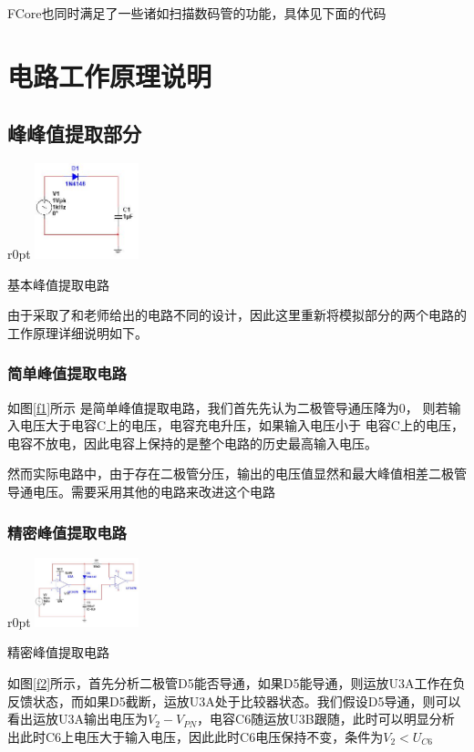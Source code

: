 \documentclass[UTF8,a4paper,landscape,16pt]{paper}
\begin{document}
\begin{multicols}{4}
\noindent FCore也同时满足了一些诸如扫描数码管的功能，具体见下面的代码

\noindent 
\section{电路工作原理说明}\small
\subsection{峰峰值提取部分}
\begin {wrapfigure}{r}{0pt}
\includegraphics [width=30mm]{f1.jpg}
\caption{基本峰值提取电路}
\label{f1}
\end {wrapfigure}
 由于采取了和老师给出的电路不同的设计，因此这里重新将模拟部分的两个电路的工作原理详细说明如下。

\subsubsection{简单峰值提取电路}

\noindent 如图\ref{f1}所示
是简单峰值提取电路，我们首先先认为二极管导通压降为0，
则若输入电压大于电容C上的电压，电容充电升压，如果输入电压小于
电容C上的电压，电容不放电，因此电容上保持的是整个电路的历史最高输入电压。

\noindent 然而实际电路中，由于存在二极管分压，输出的电压值显然和最大峰值相差二极管导通电压。需要采用其他的电路来改进这个电路

\subsubsection{精密峰值提取电路}

\begin {wrapfigure}{r}{0pt}
\includegraphics [width=30mm]{f2.jpg}
\caption{精密峰值提取电路}
\label{f2}
\end {wrapfigure}
如图\ref{f2}所示，首先分析二极管D5能否导通，如果D5能导通，则运放U3A工作在负反馈状态，而如果D5截断，运放U3A处于比较器状态。我们假设D5导通，则可以看出运放U3A输出电压为$V_2-V_{PN}$，电容C6随运放U3B跟随，此时可以明显分析出此时C6上电压大于输入电压，因此此时C6电压保持不变，条件为$V_2<U_{C6}$


\end{multicols}
\end{document}
